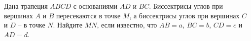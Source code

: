 \begin{ex}
	\begin{condition}
		Дана трапеция \( ABCD  \) с основаниями \( AD  \) и \( BC \). Биссектрисы углов при вершинах \( A  \) и \( B  \) пересекаются в точке \( M \), а биссектрисы углов при вершинах \( C  \) и \( D \) – в точке \( N \). Найдите \( MN \), если известно, что \( AB = a \), \( BC = b \), \( CD = c  \) и \( AD = d \).
	\end{condition}
\end{ex}